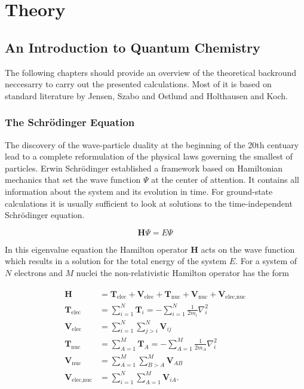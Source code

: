 
\chapter{Theory}
\label{sec:theory}


\section{An Introduction to Quantum Chemistry}
\label{sec:IntroductiontoQM}

The following chapters should provide an overview of the theoretical backround
neccesarry to carry out the presented calculations. Most of it is based on
standard literature by Jensen\autocite{jensen_introduction_2006},
Szabo and Ostlund\autocite{szabo_modern_1996} and
Holthausen and Koch\autocite{koch_chemists_2001}.

\subsection{The Schr\"odinger Equation}

The discovery of the wave-particle duality at the beginning of the 20th
centuary lead to a complete reformulation of the physical laws governing the
smallest of particles. Erwin Schr\"odinger established a framework
based on Hamiltonian mechanics that set the wave function $\Psi$ at the
center of attention. It contains all information about the system and its
evolution in time. For ground-state calculations it is usually sufficient to
look at solutions to the time-independent Schr\"odinger equation.

\begin{equation}
	\mathbf{H}\Psi=E\Psi
\end{equation}

In this eigenvalue equation the Hamilton operator $\mathbf{H}$ acts on
the wave function which results in a solution for the total energy of the system
$E$. For a system of $N$ electrons and $M$ nuclei the non-relativistic
Hamilton operator has the form

\begin{align}
\begin{aligned}
    \mathbf{H}&=\mathbf{T}_\text{elec} + \mathbf{V}_\text{elec} + \mathbf{T}_\text{nuc} + \mathbf{V}_\text{nuc} + \mathbf{V}_\text{elec,nuc} \\
    \mathbf{T}_\text{elec}&=\sum_{i=1}^N\mathbf{T}_i=-\sum_{i=1}^N\frac{1}{2m_i}\nabla_i^2 \\
    \mathbf{V}_\text{elec}&=\sum_{i=1}^N\sum_{j>i}^N\mathbf{V}_{ij} \\
    \mathbf{T}_\text{nuc}&=\sum_{A=1}^M\mathbf{T}_A=-\sum_{A=1}^M\frac{1}{2m_A}\nabla_i^2 \\
    \mathbf{V}_\text{nuc}&=\sum_{A=1}^M\sum_{B>A}^M\mathbf{V}_{AB} \\
    \mathbf{V}_\text{elec,nuc}&=\sum_{i=1}^N\sum_{A=1}^M\mathbf{V}_{iA}.\label{eqn:hamiltonoperator}
\end{aligned}
\end{align}

